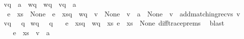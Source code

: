 \begin{isabellebody}
{\isasymnot}{\isacharparenleft}{\kern0pt}{\isacharparenleft}{\kern0pt}{\isacharquery}{\kern0pt}v{\isacharprime}{\kern0pt}{\isasymdown}\isactrlsub q\ {\isasymsqdot}\ {\isacharbrackleft}{\kern0pt}a{\isacharbrackright}{\kern0pt}{\isacharparenright}{\kern0pt}\ {\isasymsqunion}{\isasymsqunion}\isactrlsub {\isacharquery}{\kern0pt}\ {\isacharquery}{\kern0pt}wq{\isacharparenright}{\kern0pt}\ {\isasymand}\ {\isacharquery}{\kern0pt}wq\ {\isasymnoteq}\ {\isacharparenleft}{\kern0pt}{\isacharquery}{\kern0pt}v{\isacharprime}{\kern0pt}{\isasymdown}\isactrlsub q\ {\isasymsqdot}\ {\isacharbrackleft}{\kern0pt}a{\isacharbrackright}{\kern0pt}{\isacharparenright}{\kern0pt}\isanewline
{\isasymand}\ {\isacharparenleft}{\kern0pt}e\ {\isasymsqdot}\ xs{\isacharparenright}{\kern0pt}\ {\isasymin}\ {\isasymT}\isactrlbsub None\isactrlesub \ {\isasymand}\ {\isacharparenleft}{\kern0pt}e\ {\isasymsqdot}\ xs{\isacharparenright}{\kern0pt}{\isasymdown}\isactrlsub q\ {\isacharequal}{\kern0pt}\ {\isacharquery}{\kern0pt}wq\ {\isasymand}\ {\isacharquery}{\kern0pt}v{\isacharprime}{\kern0pt}\ {\isasymin}\ {\isasymT}\isactrlbsub None\isactrlesub \ {\isasymand}\ {\isacharparenleft}{\kern0pt}v\ {\isasymsqdot}\ {\isacharbrackleft}{\kern0pt}a{\isacharbrackright}{\kern0pt}{\isacharparenright}{\kern0pt}\ {\isasymin}\ {\isasymT}\isactrlbsub None\isactrlesub {\isasymdownharpoonright}\isactrlsub {\isacharbang}{\kern0pt}\ {\isasymand}\ {\isacharquery}{\kern0pt}v{\isacharprime}{\kern0pt}\ {\isacharequal}{\kern0pt}\ {\isacharparenleft}{\kern0pt}add{\isacharunderscore}{\kern0pt}matching{\isacharunderscore}{\kern0pt}recvs\ v{\isacharparenright}{\kern0pt}\ {\isasymand}\ {\isacharquery}{\kern0pt}v{\isacharprime}{\kern0pt}{\isasymdown}\isactrlsub q\ {\isasymin}\ {\isasymL}\isactrlsup {\isacharasterisk}{\kern0pt}\ q\isanewline
{\isasymand}\ {\isacharquery}{\kern0pt}wq\ {\isasymin}\ {\isasymL}\isactrlsup {\isacharasterisk}{\kern0pt}\ q{\isachardoublequoteclose}\ \ \isamarkupfalse%
\ {\isacartoucheopen}{\isacharparenleft}{\kern0pt}e\ {\isasymsqdot}\ xs{\isacharparenright}{\kern0pt}{\isasymdown}\isactrlsub q\ {\isacharequal}{\kern0pt}\ wq\ {\isasymsqdot}\ xs{\isacartoucheclose}\ {\isacartoucheopen}e\ {\isasymsqdot}\ xs\ {\isasymin}\ {\isasymT}\isactrlbsub None\isactrlesub {\isacartoucheclose}\ diff{\isacharunderscore}{\kern0pt}trace{\isacharunderscore}{\kern0pt}prems\ \isamarkupfalse%
\ blast\isanewline
\ \ \ \ \ \ \isamarkupfalse%
\ \isamarkupfalse%
\ {\isachardoublequoteopen}{\isacharparenleft}{\kern0pt}e\ {\isasymsqdot}\ xs{\isacharparenright}{\kern0pt}{\isasymdown}\isactrlsub {\isacharbang}{\kern0pt}\ {\isasymnoteq}\ {\isacharparenleft}{\kern0pt}{\isacharquery}{\kern0pt}v{\isacharprime}{\kern0pt}\ {\isasymsqdot}\ {\isacharbrackleft}{\kern0pt}a{\isacharbrackright}{\kern0pt}{\isacharparenright}{\kern0pt}{\isasymdown}\isactrlsub {\isacharbang}{\kern0pt}{\isachardoublequoteclose}\ \isamarkupfalse%

\end{isabellebody}
